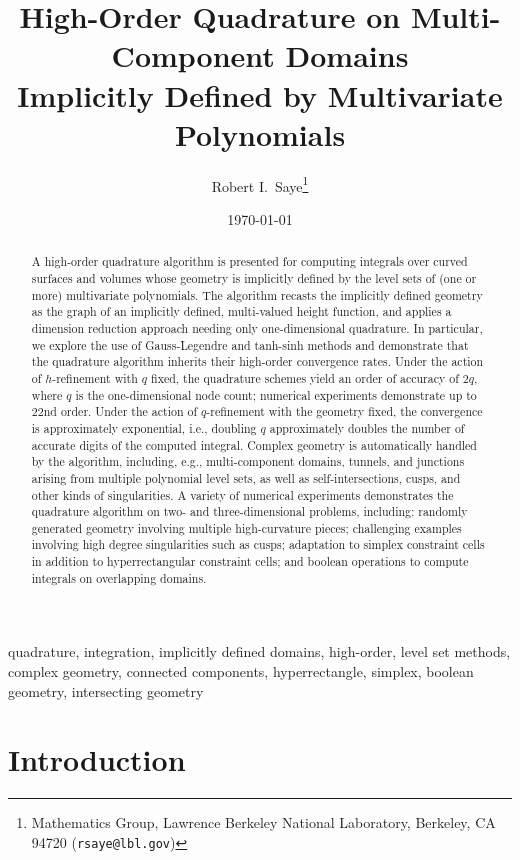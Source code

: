\documentclass[onefignum,onetabnum,onealgnum,oneeqnum]{siamart190516}
\title{High-Order Quadrature on Multi-Component Domains\\Implicitly Defined by Multivariate Polynomials}
\author{Robert I.~Saye\thanks{Mathematics Group, Lawrence Berkeley National Laboratory, Berkeley, CA 94720 (\texttt{rsaye@lbl.gov})}}
\date{\today}
\begin{document}
\setlength{\textfloatsep}{1em}

\maketitle

\begin{abstract}
A high-order quadrature algorithm is presented for computing integrals over curved surfaces and volumes whose geometry is implicitly defined by the level sets of (one or more) multivariate polynomials. The algorithm recasts the implicitly defined geometry as the graph of an implicitly defined, multi-valued height function, and applies a dimension reduction approach needing only one-dimensional quadrature. In particular, we explore the use of Gauss-Legendre and tanh-sinh methods and demonstrate that the quadrature algorithm inherits their high-order convergence rates. Under the action of $h$-refinement with $q$ fixed, the quadrature schemes yield an order of accuracy of $2q$, where $q$ is the one-dimensional node count; numerical experiments demonstrate up to $22$nd order. Under the action of $q$-refinement with the geometry fixed, the convergence is approximately exponential, i.e., doubling $q$ approximately doubles the number of accurate digits of the computed integral. Complex geometry is automatically handled by the algorithm, including, e.g., multi-component domains, tunnels, and junctions arising from multiple polynomial level sets, as well as self-intersections, cusps, and other kinds of singularities. A variety of numerical experiments demonstrates the quadrature algorithm on two- and three-dimensional problems, including: randomly generated geometry involving multiple high-curvature pieces; challenging examples involving high degree singularities such as cusps; adaptation to simplex constraint cells in addition to hyperrectangular constraint cells; and boolean operations to compute integrals on overlapping domains.
\end{abstract}

\begin{keywords}
quadrature, integration, implicitly defined domains, high-order, level set methods, complex geometry, connected components, hyperrectangle, simplex, boolean geometry, intersecting geometry
\end{keywords}


%
%
%


\section{Introduction}
\end{document}
